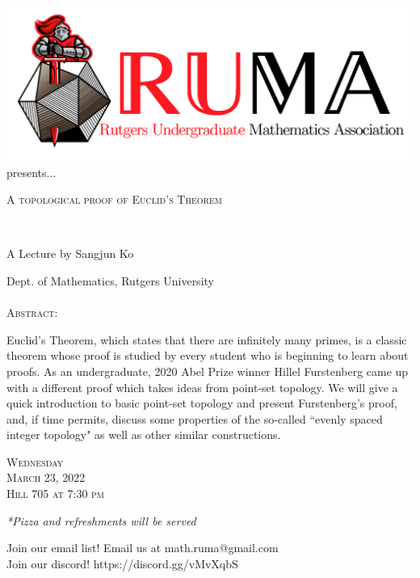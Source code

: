 \documentclass[12pt]{article}
\begin{document}

\begin{center}\includegraphics[scale=.45]{RUMAlogo.png}\\
presents... \\
\begin{spacing}{1}
{\fontsize{34}{34}\selectfont  \textsc{A topological proof of Euclid's Theorem}} \end{spacing}

 

~~\\
\begin{spacing}{1.5}
{\fontsize{23}{23} \selectfont A Lecture by Sangjun Ko}  \end{spacing} 
\large Dept. of Mathematics, Rutgers University \\~~\\

\normalsize
\textsc{Abstract:}

\Large
Euclid's Theorem, which states that there are infinitely many primes, is a classic theorem whose proof is studied by every student who is beginning to learn about proofs. As an undergraduate, 2020 Abel Prize winner Hillel Furstenberg came up with a different proof which takes ideas from point-set topology. We will give a quick introduction to basic point-set topology and present Furstenberg's proof, and, if time permits, discuss some properties of the so-called ``evenly spaced integer topology" as well as other similar constructions.


\vspace{2mm} 
\huge   \textsc{Wednesday\\March 23, 2022 \\Hill 705 at 7:30
  pm}

\vspace{2mm}
\large
\emph{*Pizza and refreshments will be served}

  \Large  Join our email list! Email us at
  math.ruma@gmail.com\\Join our discord!
  https://discord.gg/vMvXqbS
\end{center}
\end{document}
